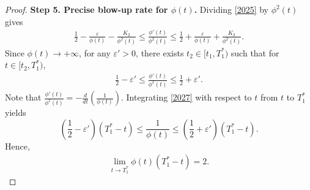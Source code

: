 \documentclass[preprint,12pt]{elsarticle}
\numberwithin{equation}{section}
\begin{document}
\begin{proof}








\noindent\textbf{Step 5. Precise blow-up rate for $\phi(t)$.}
Dividing \eqref{2025} by $\phi^2(t)$ gives
\begin{align}
\frac{1}{2} - \frac{\varepsilon}{\phi(t)} - \frac{K_2}{\phi^2(t)} \leq \frac{\phi'(t)}{\phi^2(t)} \leq \frac{1}{2} + \frac{\varepsilon}{\phi(t)} + \frac{K_2}{\phi^2(t)}.
\label{2026}
\end{align}
Since $\phi(t) \to +\infty$, for any $\varepsilon' > 0$, there exists $t_2 \in [t_1, T_{1}^*)$ such that for $t \in [t_2, T_{1}^*)$,
\begin{align}
\frac{1}{2} - \varepsilon' \leq \frac{\phi'(t)}{\phi^2(t)} \leq \frac{1}{2} + \varepsilon'.
\label{2027}
\end{align}
Note that $\frac{\phi'(t)}{\phi^2(t)} = -\frac{d}{dt} \left( \frac{1}{\phi(t)} \right)$. Integrating \eqref{2027} with respect to $t$ from $t$ to $T_{1}^*$ yields
$$ \left( \frac{1}{2} - \varepsilon' \right)(T_{1}^* - t) \leq \frac{1}{\phi(t)} \leq \left( \frac{1}{2} + \varepsilon' \right)(T_{1}^* - t).
$$
Hence,
\begin{align}
\lim_{t \to T_{1}^*} \phi(t)(T_{1}^* - t) = 2.
\label{2028}
\end{align}


\end{proof}
\end{document}
